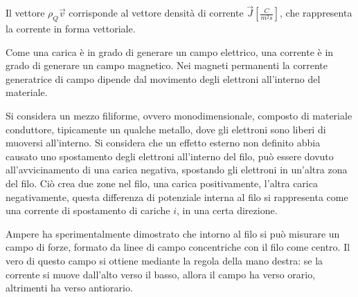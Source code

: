 \documentclass{article}
\numberwithin{equation}{subsection}
\begin{document}
Il vettore $\rho_Q\vec{v}$ corrisponde al vettore densità di corrente $\vec{J}\displaystyle\left[\frac{C}{m^2s}\right]$, che rappresenta la corrente in forma vettoriale. 



Come una carica è in grado di generare un campo elettrico, una corrente è in grado di generare un campo magnetico. Nei magneti permanenti la corrente generatrice di campo 
dipende dal movimento degli elettroni all'interno del materiale. 

Si considera un mezzo filiforme, ovvero monodimensionale, composto di materiale conduttore, tipicamente un qualche 
metallo, dove gli elettroni sono liberi di muoversi all'interno. Si considera che un effetto esterno non definito abbia causato uno spostamento degli elettroni all'interno del filo, 
può essere dovuto all'avvicinamento di una carica negativa, spostando gli elettroni in un'altra zona del filo. Ciò crea due zone nel filo, una carica positivamente, l'altra 
carica negativamente, questa differenza di potenziale interna al filo si rappresenta come una corrente di spostamento di cariche $i$, in una certa direzione. 

Ampere ha sperimentalmente dimostrato che intorno al filo si può misurare un campo di forze, formato da linee di campo concentriche con il filo come centro. Il vero di questo 
campo si ottiene mediante la regola della mano destra: se la corrente si muove dall'alto verso il basso, allora il campo ha verso orario, altrimenti ha verso antiorario. 

\begin{center}
\end{center}
\end{document}
